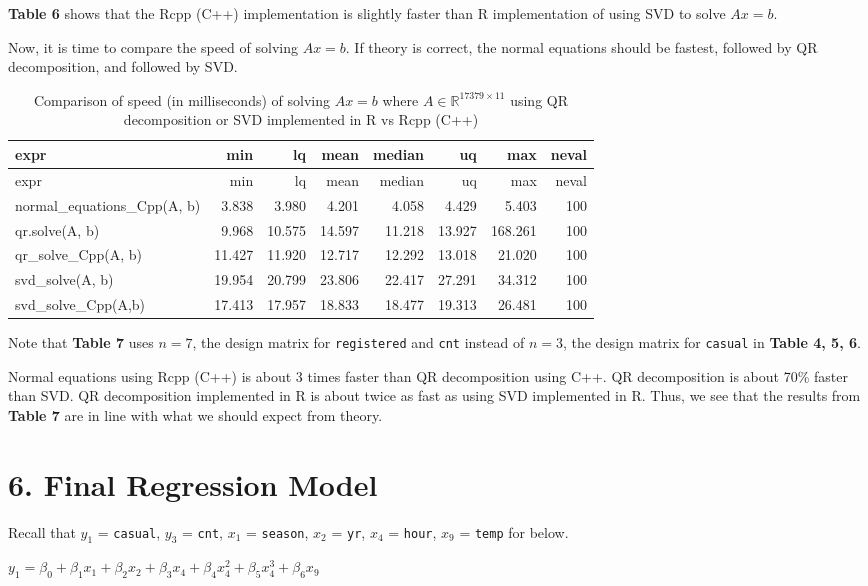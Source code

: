 \documentclass[
]{article}
\begin{document}
\textbf{Table 6} shows that the Rcpp (C++) implementation is slightly
faster than R implementation of using SVD to solve \(Ax = b\).

Now, it is time to compare the speed of solving \(Ax = b\). If theory is
correct, the normal equations should be fastest, followed by QR
decomposition, and followed by SVD.

\begin{longtable}[]{@{}lrrrrrrr@{}}
\caption{Comparison of speed (in milliseconds) of solving \(Ax = b\)
where \(A \in \mathbb{R}^{17379 \times 11}\) using QR decomposition or
SVD implemented in R vs Rcpp (C++)}\tabularnewline
\toprule
expr & min & lq & mean & median & uq & max & neval\tabularnewline
\midrule
\endfirsthead
\toprule
expr & min & lq & mean & median & uq & max & neval\tabularnewline
\midrule
\endhead
normal\_equations\_Cpp(A, b) & 3.838 & 3.980 & 4.201 & 4.058 & 4.429 &
5.403 & 100\tabularnewline
qr.solve(A, b) & 9.968 & 10.575 & 14.597 & 11.218 & 13.927 & 168.261 &
100\tabularnewline
qr\_solve\_Cpp(A, b) & 11.427 & 11.920 & 12.717 & 12.292 & 13.018 &
21.020 & 100\tabularnewline
svd\_solve(A, b) & 19.954 & 20.799 & 23.806 & 22.417 & 27.291 & 34.312 &
100\tabularnewline
svd\_solve\_Cpp(A,b) & 17.413 & 17.957 & 18.833 & 18.477 & 19.313 &
26.481 & 100\tabularnewline
\bottomrule
\end{longtable}

Note that \textbf{Table 7} uses \(n=7\), the design matrix for
\texttt{registered} and \texttt{cnt} instead of \(n=3\), the design
matrix for \texttt{casual} in \textbf{Table 4, 5, 6}.

Normal equations using Rcpp (C++) is about 3 times faster than QR
decomposition using C++. QR decomposition is about 70\% faster than SVD.
QR decomposition implemented in R is about twice as fast as using SVD
implemented in R. Thus, we see that the results from \textbf{Table 7}
are in line with what we should expect from theory.

\hypertarget{final-regression-model}{%
\section{6. Final Regression Model}\label{final-regression-model}}

Recall that \(y_{1}\) = \texttt{casual}, \(y_{3}\) = \texttt{cnt},
\(x_{1}\) = \texttt{season}, \(x_{2}\) = \texttt{yr}, \(x_{4}\) =
\texttt{hour}, \(x_{9}\) = \texttt{temp} for below.

\(y_{1} = \beta_{0} + \beta_{1}x_{1} + \beta_{2}x_{2} + \beta_{3}x_{4} + \beta_{4}x_{4}^{2} + \beta_{5}x_{4}^{3} + \beta_{6}x_{9}\)
\end{document}
